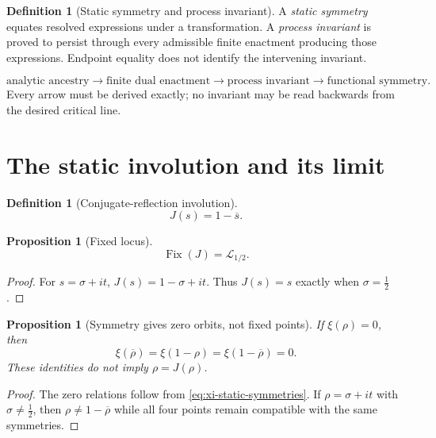 \documentclass[11pt,a4paper]{article}
\newtheorem{proposition}[theorem]{Proposition}
\theoremstyle{definition}
\newtheorem{definition}[theorem]{Definition}
\newcommand{\CriticalLine}{\mathcal{L}_{1/2}}
\newcommand{\Dual}{J}
\DeclareMathOperator{\Fix}{Fix}
\begin{document}
\begin{definition}[Static symmetry and process invariant]
A \emph{static symmetry} equates resolved expressions under a transformation.
A \emph{process invariant} is proved to persist through every admissible finite
enactment producing those expressions. Endpoint equality does not identify the
intervening invariant.
\end{definition}

\begin{equation}
\label{eq:discovery-order}
  \text{analytic ancestry}
  \longrightarrow\text{finite dual enactment}
  \longrightarrow\text{process invariant}
  \longrightarrow\text{functional symmetry}.
\end{equation}
Every arrow must be derived exactly; no invariant may be read backwards from
the desired critical line.

\section{The static involution and its limit}
\label{sec:static-involution}

\begin{definition}[Conjugate-reflection involution]
\label{def:dual-involution}
\begin{equation}
\label{eq:dual-involution}
  \Dual(s)=1-\overline{s}.
\end{equation}
\end{definition}

\begin{proposition}[Fixed locus]
\label{prop:fixed-locus}
\[
  \Fix(\Dual)=\CriticalLine.
\]
\end{proposition}
\begin{proof}
For $s=\sigma+it$, $\Dual(s)=1-\sigma+it$. Thus $\Dual(s)=s$ exactly when
$\sigma=\tfrac12$.
\end{proof}

\begin{proposition}[Symmetry gives zero orbits, not fixed points]
\label{prop:symmetry-not-fixedness}
If $\xi(\rho)=0$, then
\[
  \xi(\overline{\rho})=\xi(1-\rho)=\xi(1-\overline{\rho})=0.
\]
These identities do not imply $\rho=\Dual(\rho)$.
\end{proposition}
\begin{proof}
The zero relations follow from \cref{eq:xi-static-symmetries}. If
$\rho=\sigma+it$ with $\sigma\neq\tfrac12$, then
$\rho\neq1-\overline{\rho}$ while all four points remain compatible with the
same symmetries.
\end{proof}
\end{document}

